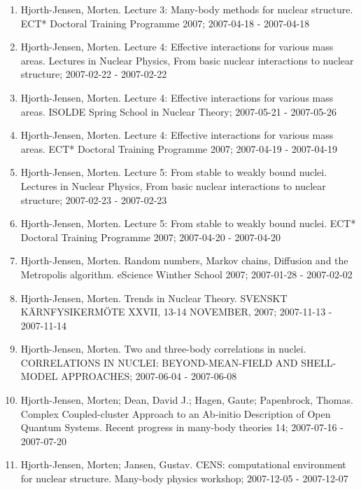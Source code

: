 \documentclass[%
oneside,                 %
final,                   %
10pt]{article}
\begin{document}
\begin{enumerate}
\item Hjorth-Jensen, Morten.  Lecture 3: Many-body methods for nuclear structure. ECT* Doctoral Training Programme 2007; 2007-04-18 - 2007-04-18

\item Hjorth-Jensen, Morten.  Lecture 4: Effective interactions for various mass areas. Lectures in Nuclear Physics, From basic nuclear interactions to nuclear structure; 2007-02-22 - 2007-02-22

\item Hjorth-Jensen, Morten.  Lecture 4: Effective interactions for various mass areas. ISOLDE Spring School in Nuclear Theory; 2007-05-21 - 2007-05-26

\item Hjorth-Jensen, Morten.  Lecture 4: Effective interactions for various mass areas. ECT* Doctoral Training Programme 2007; 2007-04-19 - 2007-04-19

\item Hjorth-Jensen, Morten.  Lecture 5: From stable to weakly bound nuclei. Lectures in Nuclear Physics, From basic nuclear interactions to nuclear structure; 2007-02-23 - 2007-02-23

\item Hjorth-Jensen, Morten.  Lecture 5: From stable to weakly bound nuclei. ECT* Doctoral Training Programme 2007; 2007-04-20 - 2007-04-20

\item Hjorth-Jensen, Morten.  Random numbers, Markov chains, Diffusion and the Metropolis algorithm. eScience Winther School 2007; 2007-01-28 - 2007-02-02

\item Hjorth-Jensen, Morten.  Trends in Nuclear Theory. SVENSKT KÄRNFYSIKERMÖTE XXVII, 13-14 NOVEMBER, 2007; 2007-11-13 - 2007-11-14

\item Hjorth-Jensen, Morten.  Two and three-body correlations in nuclei. CORRELATIONS IN NUCLEI: BEYOND-MEAN-FIELD AND SHELL-MODEL APPROACHES; 2007-06-04 - 2007-06-08

\item Hjorth-Jensen, Morten; Dean, David J.; Hagen, Gaute; Papenbrock, Thomas.  Complex Coupled-cluster Approach to an Ab-initio Description of Open Quantum Systems. Recent progress in many-body theories 14; 2007-07-16 - 2007-07-20

\item Hjorth-Jensen, Morten; Jansen, Gustav.  CENS: computational environment for nuclear structure. Many-body physics workshop; 2007-12-05 - 2007-12-07


\end{enumerate}
\end{document}

